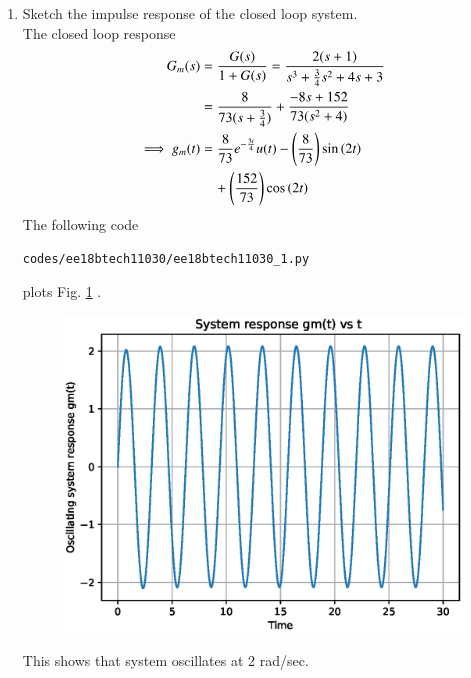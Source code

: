 \begin{enumerate}[label=\thesubsection.\arabic*.,ref=\thesubsection.\theenumi]
\item Sketch the impulse response of the closed loop system.
\\
\solution The closed loop response
\begin{align}
 G_{m}(s) &= \frac{G(s)}{1+G(s)}=\frac{2(s+1)}{s^3+\frac{3}{4}s^2+4s+3} 
\\
 &= \frac{8}{73(s+\frac{3}{4})}+ \frac{-8s+152}{73(s^2+4)}
\\
 \implies g_{m}(t) &= \frac{8}{73}e^{-\frac{3t}{4}}u(t)- \left(\frac{8}{73}\right)\sin\left(2t\right) 
\nonumber \\
&\quad +\left(\frac{152}{73}\right)\cos\left(2t\right)
\end{align}
%
The following code 
\begin{lstlisting}
codes/ee18btech11030/ee18btech11030_1.py
\end{lstlisting}
plots Fig. \ref{fig:ee18btech11030_sine} .
%
\begin{figure}[!h]
\centering
  \includegraphics[width=\columnwidth]{./figs/ee18btech11030/ee18btech11030_1.eps}
\caption{}
\label{fig:ee18btech11030_sine} 
\end{figure}
%
This shows that system oscillates at 2 rad/sec.
\end{enumerate}
